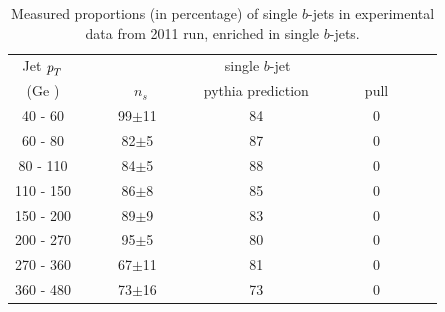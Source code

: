 



\begin{table}[!hbt] %
\renewcommand{\arraystretch}{1.2}
\centering
\begin{tabular}{ | c || c | c | c ||}
  \hline
  Jet ${\emph{p}_{T}}$ & \multicolumn{3}{c||}{single $b$-jet}\\ \cline{2-4}
    (Ge ) & ~~~~~~~$n_s$~~~~~~ & pythia prediction & ~~~~~~pull~~~~~~\\ \hline
   40 - 60 &  99$\pm$11 & 84   & 0 \\  
   60 - 80 &  82$\pm$5  &  87  & 0\\ 
   80 - 110&  84$\pm$5  &  88 & 0\\ 
  110 - 150&  86$\pm$8  &  85 & 0\\ 
  150 - 200&  89$\pm$9  &  83 & 0 \\ 
  200 - 270&  95$\pm$5  &  80 & 0 \\ 
  270 - 360&  67$\pm$11  &  81 & 0 \\ 
  360 - 480&  73$\pm$16  &  73 & 0 \\ \hline
\end{tabular}
\caption{Measured proportions (in percentage) of single $b$-jets in experimental data from 2011 run, enriched in single $b$-jets.}
\label{tb:fitfractions2btagS}
\end{table}

